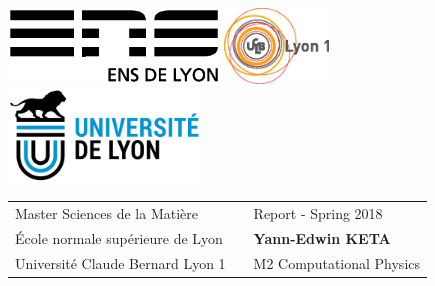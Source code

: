 \documentclass[class=report, float=false, crop=false]{standalone}
\begin{document}
\thispagestyle{empty}

{
\vspace*{-3cm}
\noindent{}
}

\vspace{2cm}

\includegraphics[height=2cm]{logoens.eps} \hfill \includegraphics[height=2cm]{logoucbl.eps} \hfill \includegraphics[height=2.5cm]{udl-logo.png}

\vspace{0.5cm}

\begin{tabularx}{\textwidth}{ @{} l X l @{} }
{\sc Master Sciences de la Matière} & & \hfill Report - Spring 2018 \\
École normale supérieure de Lyon & & \hfill \textbf{Yann-Edwin KETA} \\
Université Claude Bernard Lyon 1 & & \hfill M2 Computational Physics
\end{tabularx}
\end{document}
